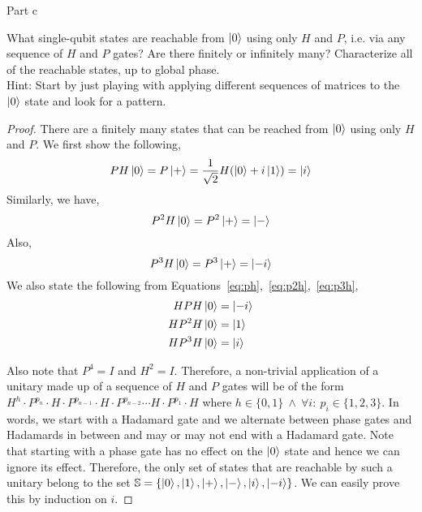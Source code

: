 \begin{solution}{Part c}\label{ques:3c}
  \begin{question}
    What single-qubit states are reachable from $\ket{0}$ using only $H$ and $P$, i.e. via any sequence of $H$ and $P$ gates? Are there finitely or infinitely many? Characterize all of the reachable states, up to global phase.
\\ Hint: Start by just playing with applying different sequences of matrices to the $\ket{0}$ state and look for a pattern.
  \end{question}
  \tcblower{}
  \begin{proof}
    There are a finitely many states that can be reached from $\ket{0}$ using only $H$ and $P$. We first show the following,
    \begin{equation}
      PH\ket{0} = P\ket{+} = \frac{1}{\sqrt{2}}H(\ket{0} + i\ket{1}) = \ket{i}
      \label{eq:ph}
    \end{equation}
    Similarly, we have,
    \begin{equation}
      P^2H\ket{0} = P^2\ket{+} = \ket{-}
      \label{eq:p2h}
    \end{equation}
    Also,
    \begin{equation}
      P^3H\ket{0} = P^3\ket{+} = \ket{-i}
      \label{eq:p3h}
    \end{equation}
    We also state the following from Equations~\ref{eq:ph},~\ref{eq:p2h},~\ref{eq:p3h},
    \begin{equation}
      \begin{split}
        HPH\ket{0} &= \ket{-i}\\
        HP^2H\ket{0} &= \ket{1}\\
        HP^3H\ket{0} &= \ket{i}
      \end{split}
      \label{eq:hpih}
    \end{equation}

    Also note that $P^4 = I$ and $H^2 = I$. Therefore, a non-trivial application of a unitary made up of a sequence of $H$ and $P$ gates will be of the form $H^{h}\cdot P^{p_n}\cdot H\cdot P^{p_{n-1}}\cdot H\cdot P^{p_{n-2}}\cdots H\cdot P^{p_1}\cdot H$ where $h\in \{0, 1\}\ \wedge\ \forall i:\ p_i \in \{1, 2, 3\}$. In words, we start with a Hadamard gate and we alternate between phase gates and Hadamards in between and may or may not end with a Hadamard gate. Note that starting with a phase gate has no effect on the $\ket{0}$ state and hence we can ignore its effect. Therefore, the only set of states that are reachable by such a unitary belong to the set $\mathbb{S} = \{\ket{0}, \ket{1}, \ket{+}, \ket{-}, \ket{i}, \ket{-i}\}$. We can easily prove this by induction on $i$.
  \end{proof}
\end{solution}
